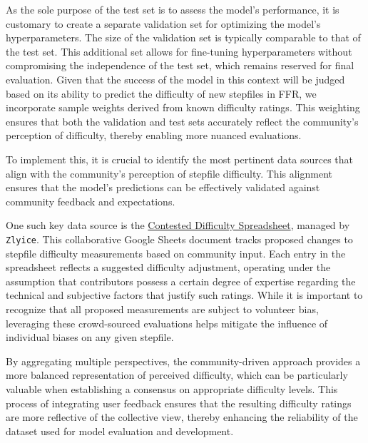 \vspace{2mm}

As the sole purpose of the test set is to assess the model's performance, it is customary to create a separate validation set for optimizing the model’s hyperparameters. The size of the validation set is typically comparable to that of the test set. This additional set allows for fine-tuning hyperparameters without compromising the independence of the test set, which remains reserved for final evaluation. Given that the success of the model in this context will be judged based on its ability to predict the difficulty of new stepfiles in FFR, we incorporate sample weights derived from known difficulty ratings. This weighting ensures that both the validation and test sets accurately reflect the community's perception of difficulty, thereby enabling more nuanced evaluations.

\vspace{2mm}

To implement this, it is crucial to identify the most pertinent data sources that align with the community's perception of stepfile difficulty. This alignment ensures that the model’s predictions can be effectively validated against community feedback and expectations.

\vspace{2mm}
One such key data source is the \href{https://docs.google.com/spreadsheets/d/1Wm1RHG318EK07U4VDXkztKTKnfy9wEOQqWRiTclbCz8/edit?gid=0#gid=0}{Contested Difficulty Spreadsheet}, managed by \texttt{Zlyice}. This collaborative Google Sheets document tracks proposed changes to stepfile difficulty measurements based on community input. Each entry in the spreadsheet reflects a suggested difficulty adjustment, operating under the assumption that contributors possess a certain degree of expertise regarding the technical and subjective factors that justify such ratings. While it is important to recognize that all proposed measurements are subject to volunteer bias, leveraging these crowd-sourced evaluations helps mitigate the influence of individual biases on any given stepfile.

\vspace{2mm}
By aggregating multiple perspectives, the community-driven approach provides a more balanced representation of perceived difficulty, which can be particularly valuable when establishing a consensus on appropriate difficulty levels. This process of integrating user feedback ensures that the resulting difficulty ratings are more reflective of the collective view, thereby enhancing the reliability of the dataset used for model evaluation and development.

